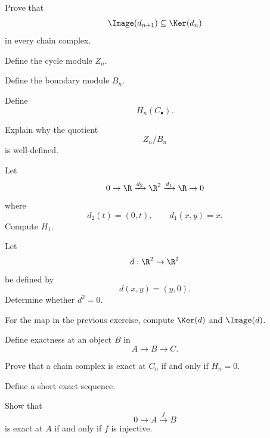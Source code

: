 \begin{exercise}[2]
Prove that
\[ \Image(d_{n+1})\subseteq\Ker(d_n) \]
in every chain complex.
\end{exercise}

\begin{exercise}[1]
Define the cycle module \(Z_n\).
\end{exercise}

\begin{exercise}[1]
Define the boundary module \(B_n\).
\end{exercise}

\begin{exercise}[1]
Define
\[ H_n(C_\bullet). \]
\end{exercise}

\begin{exercise}[2]
Explain why the quotient
\[ Z_n/B_n \]
is well-defined.
\end{exercise}

\begin{exercise}[2]
Let
\[ 0\to\R\xrightarrow{d_2}\R^2\xrightarrow{d_1}\R\to0 \]
where
\[ d_2(t)=(0,t),\qquad d_1(x,y)=x. \]
Compute \(H_1\).
\end{exercise}

\begin{exercise}[2]
Let
\[ d:\R^2\to\R^2 \]
be defined by
\[ d(x,y)=(y,0). \]
Determine whether \(d^2=0\).
\end{exercise}

\begin{exercise}[2]
For the map in the previous exercise, compute \(\Ker(d)\) and
\(\Image(d)\).
\end{exercise}

\begin{exercise}[1]
Define exactness at an object \(B\) in
\[ A\to B\to C. \]
\end{exercise}

\begin{exercise}[2]
Prove that a chain complex is exact at \(C_n\) if and only if \(H_n=0\).
\end{exercise}

\begin{exercise}[1]
Define a short exact sequence.
\end{exercise}

\begin{exercise}[2]
Show that
\[ 0\to A\xrightarrow{f}B \]
is exact at \(A\) if and only if \(f\) is injective.
\end{exercise}

